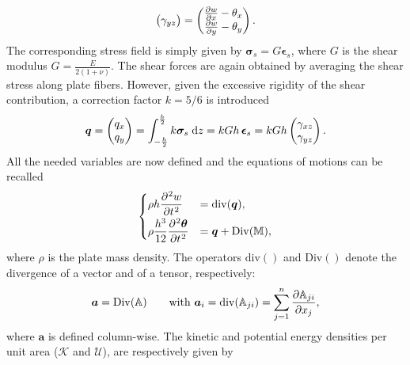\documentclass[preprint,12pt]{elsarticle}
\begin{document}
{\begin{equation}
\begin{pmatrix}
\gamma_{yz} \\
\end{pmatrix} = 
\begin{pmatrix}
\diffp{w}{x} - \theta_x \\
\diffp{w}{y} - \theta_y \\
\end{pmatrix}.
\end{equation}
The corresponding stress field is simply given by $\bm\sigma_s = G \bm{\epsilon}_s$, where $G$ is the shear modulus $G = \frac{E}{2 (1 + \nu)}$. The shear forces are again obtained by averaging the shear stress along plate fibers. However, given the excessive rigidity of the shear contribution, a correction factor $k = 5/6$ \cite{mindlin} is introduced
\begin{equation}
	\bm{q} = \begin{pmatrix}
	q_x \\
	q_y \\
	\end{pmatrix} =
	\int_{-\frac{h}{2} }^{ \frac{h}{2} } k \bm\sigma_s \d{z} = k G h \, \bm{\epsilon}_s = k G h
	\begin{pmatrix}
	\gamma_{xz} \\
	\gamma_{yz} \\
	\end{pmatrix}.
\end{equation}
All the needed variables are now defined and the equations of motions can be recalled \cite{mindlin}
\begin{equation}
\begin{cases}
\displaystyle \rho h \diffp[2]{w}{t} &= \mathrm{div}(\bm{q}),  \vspace{1mm}\\
\displaystyle \rho\frac{h^3}{12} \diffp[2]{\bm \theta}{t} &= \bm{q} + \mathrm{Div}(\mathbb{M}), \\
\end{cases}
\end{equation}
where $\rho$ is the plate mass density. The operators $\mathrm{div}()$ and $\mathrm{Div}()$ denote the divergence of a vector and of a tensor, respectively:
\begin{equation*}
\bm{a} = \mathrm{Div}(\mathbb{A})  \qquad \text{with } \bm{a}_i = \mathrm{div}(\mathbb{A}_{ji}) = \sum_{j = 1}^n \diffp{\mathbb{A}_{ji}}{x_j},
\end{equation*}
where $\bm{a}$ is defined column-wise. The kinetic and potential energy densities per unit area ($\mathcal{K}$ and $\mathcal{U}$), are respectively given by
}
\end{document}
